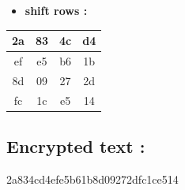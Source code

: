 \documentclass{article}
\begin{document}
\begin{itemize}
    \item \textbf{shift rows :}
\end{itemize} \begin{tabular}{|c|c|c|c|}
\hline 2a & 83 & 4c & d4 \\ \hline ef & e5 & b6 & 1b \\ \hline 8d & 09 & 27 & 2d \\ \hline fc & 1c & e5 & 14 \\ \hline \end{tabular}\hspace{0.5cm}\vspace{0.1cm}\subsection*{Encrypted text : } 2a834cd4efe5b61b8d09272dfc1ce514
\end{document}
